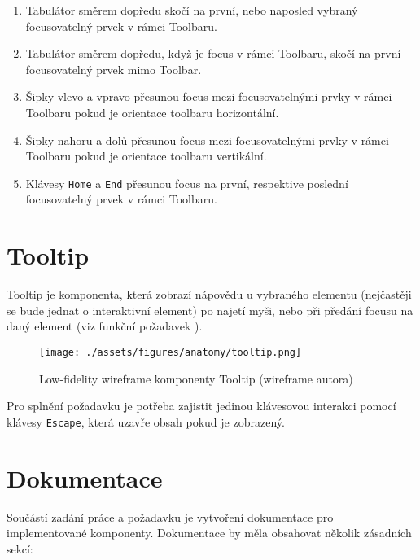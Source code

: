 \begin{enumerate}
    \item Tabulátor směrem dopředu skočí na první, nebo naposled vybraný focusovatelný prvek v rámci Toolbaru.
    \item Tabulátor směrem dopředu, když je focus v rámci Toolbaru, skočí na první focusovatelný prvek mimo Toolbar.
    \item Šipky vlevo a vpravo přesunou focus mezi focusovatelnými prvky v rámci Toolbaru pokud je orientace toolbaru horizontální.
    \item Šipky nahoru a dolů přesunou focus mezi focusovatelnými prvky v rámci Toolbaru pokud je orientace toolbaru vertikální.
    \item Klávesy \texttt{Home} a \texttt{End} přesunou focus na první, respektive poslední focusovatelný prvek v rámci Toolbaru.
\end{enumerate}

\section{Tooltip}

Tooltip je komponenta, která zobrazí nápovědu u vybraného elementu (nejčastěji se bude jednat o interaktivní element) po najetí myši, nebo při předání focusu na daný element (viz funkční požadavek \hyperref[tlfr11]{}).

\begin{figure}[htp]
    \centering
    \texttt{[image: ./assets/figures/anatomy/tooltip.png]}
    \captionsetup{justification=centering}
    \caption[Low-fidelity wireframe komponenty Tooltip]{Low-fidelity wireframe komponenty Tooltip (wireframe autora)}
\end{figure}

Pro splnění požadavku \hyperref[ofr11]{} je potřeba zajistit jedinou klávesovou interakci pomocí klávesy \texttt{Escape}, která uzavře obsah pokud je zobrazený.

\clearpage

\section{Dokumentace}

Součástí zadání práce a požadavku \hyperref[nfr14]{} je vytvoření dokumentace pro implementované komponenty.
Dokumentace by měla obsahovat několik zásadních sekcí:

